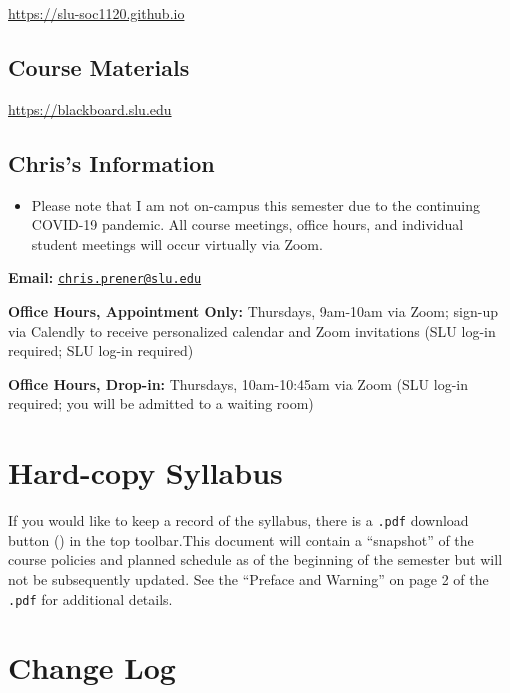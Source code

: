 \documentclass[
]{book}
\newenvironment{rmdblock}[1]
  {\begin{shaded*}
  \begin{itemize}
  \renewcommand{\labelitemi}{
    \raisebox{-.7\height}[0pt][0pt]{
      {\setkeys{Gin}{width=3em,keepaspectratio}\texttt{[image: images/\#1]}}
    }
  }
  \item
  }
  {
  \end{itemize}
  \end{shaded*}
  }
\newenvironment{rmdwarning}
  {\begin{rmdblock}{warning}}
  {\end{rmdblock}}
\begin{document}
\url{https://slu-soc1120.github.io}

\hypertarget{course-materials}{%
\subsection*{Course Materials}\label{course-materials}}

\url{https://blackboard.slu.edu}

\hypertarget{chriss-information}{%
\subsection*{Chris's Information}\label{chriss-information}}

\begin{rmdwarning}
Please note that I am not on-campus this semester due to the continuing
COVID-19 pandemic. All course meetings, office hours, and individual
student meetings will occur virtually via Zoom.
\end{rmdwarning}

\textbf{Email:} \href{mailto:chris.prener@slu.edu}{\nolinkurl{chris.prener@slu.edu}}

\textbf{Office Hours, Appointment Only:} Thursdays, 9am-10am via Zoom; sign-up via Calendly to receive personalized calendar and Zoom invitations (SLU log-in required; SLU log-in required)

\textbf{Office Hours, Drop-in:} Thursdays, 10am-10:45am via Zoom (SLU log-in required; you will be admitted to a waiting room)

\hypertarget{hard-copy-syllabus}{%
\section*{Hard-copy Syllabus}\label{hard-copy-syllabus}}

If you would like to keep a record of the syllabus, there is a \texttt{.pdf} download button () in the top toolbar.This document will contain a ``snapshot'' of the course policies and planned schedule as of the beginning of the semester but will not be subsequently updated. See the ``Preface and Warning'' on page 2 of the \texttt{.pdf} for additional details.

\hypertarget{change-log}{%
\section*{Change Log}\label{change-log}}
\end{document}
